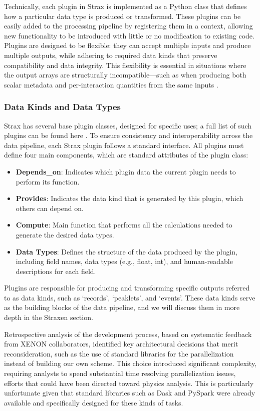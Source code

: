 Technically, each plugin in Strax is implemented as a Python class that defines how a particular data type is produced or transformed. These plugins can be easily added to the processing pipeline by registering them in a context, allowing new functionality to be introduced with little or no modification to existing code. Plugins are designed to be flexible: they can accept multiple inputs and produce multiple outputs, while adhering to required data kinds that preserve compatibility and data integrity. This flexibility is essential in situations where the output arrays are structurally incompatible—such as when producing both scalar metadata and per-interaction quantities from the same inputs \cite{strax_plugin_dev}.


\subsubsection*{Data Kinds and Data Types}

Strax has several base plugin classes, designed for specific uses; a full list of such plugins can be found here \cite{strax_plugin_dev}. To ensure consistency and interoperability across the data pipeline, each Strax plugin follows a standard interface. All plugins must define four main components, which are standard attributes of the plugin class:

\begin{itemize}
    \item \textbf{Depends\_on}: Indicates which plugin data the current plugin needs to perform its function.
    \item \textbf{Provides}: Indicates the data kind that is generated by this plugin, which others can depend on.
    \item \textbf{Compute}: Main function that performs all the calculations needed to generate the desired data types.
    \item \textbf{Data Types}: Defines the structure of the data produced by the plugin, including field names, data types (e.g., float, int), and human-readable descriptions for each field.
\end{itemize}

Plugins are responsible for producing and transforming specific outputs referred to as data kinds, such as `records', `peaklets', and `events'. These data kinds serve as the building blocks of the data pipeline, and we will discuss them in more depth in the Straxen section.


Retrospective analysis of the development process, based on systematic feedback from XENON collaborators, identified key architectural decisions that merit reconsideration, such as the use of standard libraries for the parallelization instead of building our own scheme. This choice introduced significant complexity, requiring analysts to spend substantial time resolving parallelization issues, efforts that could have been directed toward physics analysis. This is particularly unfortunate given that standard libraries such as Dask \cite{dask_docs} and PySpark \cite{spark_python_api} were already available and specifically designed for these kinds of tasks.

